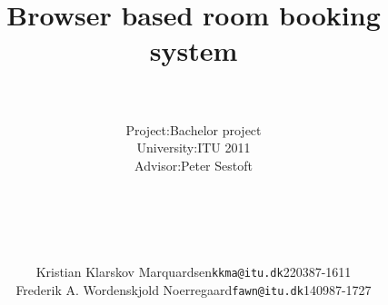 \documentclass[12pt,a4paper]{report}
\begin{document}

\title{\Huge{\textsf{\textbf{Browser based room booking system}}}}
\author{
		\hline \\
		\begin{tabular}{ l l }
		Project: & Bachelor project \\
		University: & ITU 2011 \\
		Advisor: & Peter Sestoft\\
		\end{tabular}\\
		\mbox{} \\
		\hline \\
		\mbox{}\\
		\begin{tabular} { l l l }
				Kristian Klarskov Marquardsen & \texttt{kkma@itu.dk} &220387-1611\\
				Frederik A. Wordenskjold Noerregaard & \texttt{fawn@itu.dk} & 140987-1727\\
		\end{tabular}\\
		\mbox{}}
\date{}
\maketitle
\end{document}

